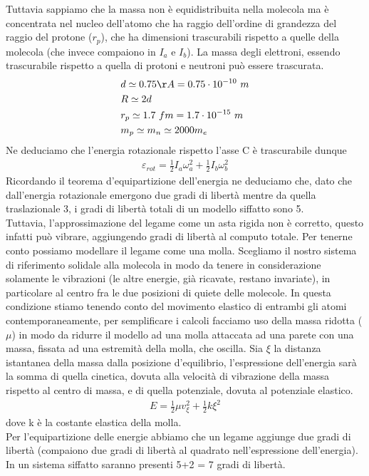 \documentclass[
10pt, %
a4paper, %
oneside, %
headinclude,footinclude, %
BCOR5mm, %
]{scrartcl}
\begin{document}
\FloatBarrier
Tuttavia sappiamo che la massa non è equidistribuita nella molecola ma è concentrata nel nucleo dell'atomo che ha raggio dell'ordine di grandezza del raggio del protone (\(r_p\)), che ha dimensioni trascurabili rispetto a quelle della molecola (che invece compaiono in $I_a$ e $I_b$). La massa degli elettroni, essendo trascurabile rispetto a quella di protoni e neutroni può essere trascurata.
\begin{align*} 
	&d \simeq 0.75\AA = 0.75 \cdot 10^{-10}\ m\\
	&R \simeq 2d\\
	&r_p \simeq 1.7\ fm = 1.7\cdot 10^{-15}\ m\\
	&m_p\simeq m_n \simeq 2000m_e
\end{align*} 
Ne deduciamo che l'energia rotazionale rispetto l'asse C è trascurabile dunque
\begin{align*} 
	\varepsilon_{rot} = \frac{1}{2 }I_a \omega_a^2 + \frac{1}{2 } I_b \omega_b^2
\end{align*} 
Ricordando il teorema d'equipartizione dell'energia ne deduciamo che, dato che dall'energia rotazionale emergono due gradi di libertà mentre da quella traslazionale 3, i gradi di libertà totali di un modello siffatto sono 5.\\
Tuttavia, l'approssimazione del legame come un asta rigida non è corretto, questo infatti può vibrare, aggiungendo gradi di libertà al computo totale. Per tenerne conto possiamo modellare il legame come una molla. Scegliamo il nostro sistema di riferimento solidale alla molecola in modo da tenere in considerazione solamente le vibrazioni (le altre energie, già ricavate, restano invariate), in particolare al centro fra le due posizioni di quiete delle molecole. In questa condizione stiamo tenendo conto del movimento elastico di entrambi gli atomi contemporaneamente, per semplificare i calcoli facciamo uso della massa ridotta ($\mu$) in modo da ridurre il modello ad una molla attaccata ad una parete con una massa, fissata ad una estremità della molla, che oscilla. Sia $\xi$ la distanza istantanea della massa dalla posizione d'equilibrio, l'espressione dell'energia sarà la somma di quella cinetica, dovuta alla velocità di vibrazione della massa rispetto al centro di massa, e di quella potenziale, dovuta al potenziale elastico. 
\begin{align*} 
	E = \frac{1}{2}\mu v_{\xi}^2+\frac{1}{2}k\xi^2
\end{align*} 
dove k è la costante elastica della molla.\\
Per l'equipartizione delle energie abbiamo che un legame aggiunge due gradi di libertà (compaiono due gradi di libertà al quadrato nell'espressione dell'energia). In un sistema siffatto saranno presenti 5+2 = 7 gradi di libertà.\\
\end{document}
